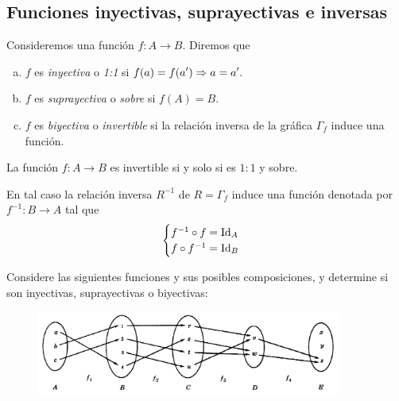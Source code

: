 % 
% 


\subsection{Funciones inyectivas, suprayectivas e inversas}


	\begin{defn} Consideremos una función $f:A\to B.$ Diremos que
		\begin{enumerate}[(a)]
			\item $f$ es \emph{inyectiva} o \emph{1:1} si $\displaystyle f(a)=f(a')\Rightarrow a=a'.$ 
			
			\item $f$ es \emph{suprayectiva} o \emph{sobre} si
			$\displaystyle f(A)=B.$ 
			
			\item $f$ es \emph{biyectiva} o \emph{invertible} si la relación inversa de la gráfica $\Gamma_{f}$ induce una función. 
		\end{enumerate}
		
	\end{defn}



	\begin{prop}
		La función $f:A\to B$ es invertible si y solo si es $1:1$ y sobre.  
		
		En tal caso la relación inversa $R^{-1}$ de $R=\Gamma_{f}$ induce una función denotada por $\displaystyle f^{-1}:B\to A$ tal que
		$$
		\begin{cases}
			f^{-1} \circ f = \operatorname{Id}_{A}\\
			f \circ f^{-1} = \operatorname{Id}_{B}
		\end{cases}
		$$
	\end{prop}
	



	\begin{problema}
		Considere las siguientes funciones y sus posibles composiciones, y determine si son inyectivas, suprayectivas o biyectivas:
		
		\begin{figure}[h!]
			\centering
			\includegraphics[width=10cm,keepaspectratio=true]{./md/MD02_IM01.png}
			\label{fig:MD0201}
		\end{figure}
		
	\end{problema}
	



